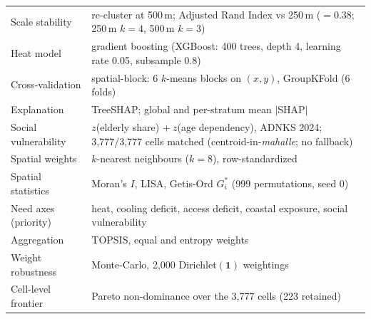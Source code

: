 \begin{table}[htbp]
\begin{singlespace}
\begin{tabular}{@{}p{}p{}@{}}
  Scale stability           & re-cluster at 500\,m; Adjusted Rand Index vs 250\,m ($=0.38$; 250\,m $k=4$, 500\,m $k=3$) \\
  Heat model                & gradient boosting (XGBoost: 400 trees, depth 4, learning rate 0.05, subsample 0.8) \\
  Cross-validation          & spatial-block: 6 $k$-means blocks on $(x,y)$, GroupKFold (6 folds) \\
  Explanation               & TreeSHAP; global and per-stratum mean $|\text{SHAP}|$ \\
  Social vulnerability      & $z$(elderly share) $+\ z$(age dependency), ADNKS 2024; 3{,}777/3{,}777 cells matched (centroid-in-\emph{mahalle}; no fallback) \\
  Spatial weights           & $k$-nearest neighbours ($k=8$), row-standardized \\
  Spatial statistics        & Moran's $I$, LISA, Getis-Ord $G_i^{*}$ (999 permutations, seed 0) \\
  Need axes (priority)      & heat, cooling deficit, access deficit, coastal exposure, social vulnerability \\
  Aggregation               & TOPSIS, equal and entropy weights \\
  Weight robustness         & Monte-Carlo, 2{,}000 Dirichlet$(\mathbf{1})$ weightings \\
  Cell-level frontier       & Pareto non-dominance over the 3{,}777 cells (223 retained) \\
  \bottomrule
  \end{tabular}
  \end{singlespace}
\end{table}

